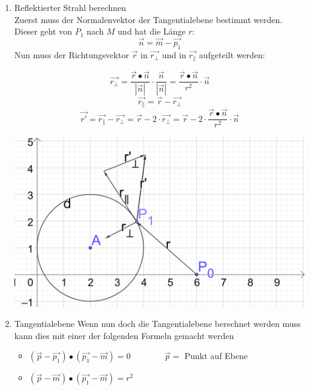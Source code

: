 \begin{enumerate}
		\item Reflektierter Strahl berechnen\\
		Zuerst muss der Normalenvektor der Tangentialebene bestimmt werden. Dieser geht von $P_1$ nach $M$ und hat die Länge $r$:\\
		\begin{equation*}
			\vec{n} = \vec{m} -\vec{p_1}
		\end{equation*}
		Nun muss der Richtungsvektor $\vec{r}$ in $\vec{r_\perp}$ und in $\vec{r_\parallel}$ aufgeteilt werden:\\
			\begin{minipage}{0.5\textwidth}
			\begin{equation*}
			\vec{r_\perp} = \displaystyle \frac{\vec{r} \bullet \vec{n}}{|\vec{n}|} \cdot
			\displaystyle \frac{\vec{n}}{|\vec{n}|}
			= \displaystyle \frac{\vec{r} \bullet \vec{n}}{r^2} \cdot \vec{n}
			\end{equation*}
			\begin{equation*}
			\vec{r_\parallel} = \vec{r} - \vec{r_\perp}
			\end{equation*}
			\begin{equation*}
			\vec{r'} = \vec{r_\parallel} - \vec{r_\perp} =
			\vec{r} - 2 \cdot \vec{r_\perp} =
			\vec{r} -2 \cdot \displaystyle \frac{\vec{r} \bullet \vec{n}}{r^2} \cdot \vec{n}
			\end{equation*}
			\end{minipage}
		\begin{minipage}{0.5\textwidth}
			\includegraphics[width=\textwidth]{pics/Kugelprojektion_2.png}
		\end{minipage}
	
	\item Tangentialebene
		Wenn nun doch die Tangentialebene berechnet werden muss kann dies mit einer der folgenden Formeln gemacht werden
		\begin{itemize}
			\item $(\vec{p} - \vec{p_1}) \bullet (\vec{p_1} - \vec{m}) = 0 \qquad \qquad \vec{p} =$ Punkt auf Ebene
			\item $(\vec{p}-\vec{m}) \bullet (\vec{p_1} - \vec{m})=r^2$
		\end{itemize}
	\end{enumerate}
